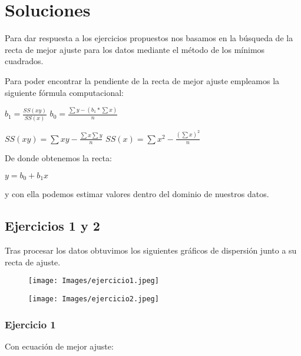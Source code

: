 \documentclass[a4paper,10pt,twocolumn]{article}
\begin{document}
	\section{Soluciones}\label{sub:answers}
		Para dar respuesta a los ejercicios propuestos nos basamos en la búsqueda de la recta de mejor ajuste para los datos mediante el método de los mínimos cuadrados. 
		
		Para poder encontrar la pendiente de la recta de mejor ajuste empleamos la siguiente fórmula computacional:
		
		\begin{center}
			$b_1 = \frac{SS(xy)}{SS(x)}$
			$b_0 = \frac{\sum y - (b_1 * \sum x)}{n}$
		\end{center}
	
		\begin{center}
			$SS(xy) = \sum xy - \frac{\sum x \sum y}{n}$
			$SS(x) = \sum x^2 - \frac{(\sum x)^2}{n}$
		\end{center}
		
		De donde obtenemos la recta:
		
		\begin{center}
			$y = b_0 + b_1x$
		\end{center}
	
		y con ella podemos estimar valores dentro del dominio de nuestros datos.
		
		\subsection{Ejercicios 1 y 2}
			Tras procesar los datos obtuvimos los siguientes gráficos de dispersión junto a su recta de ajuste.
			
			\begin{figure}[h]
				\texttt{[image: Images/ejercicio1.jpeg]}
			\end{figure}
		
			\begin{figure}[htb]
				\texttt{[image: Images/ejercicio2.jpeg]}
			\end{figure}
		
			\subsubsection{Ejercicio 1}
			
			Con ecuación de mejor ajuste:
			
\end{document}
